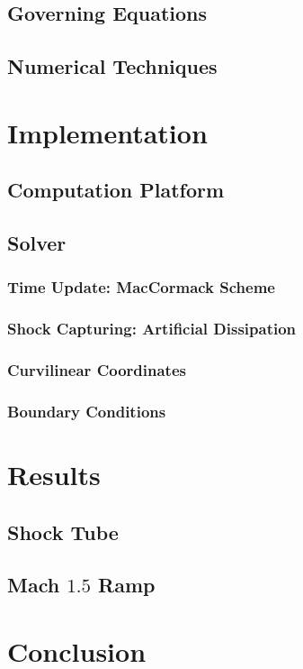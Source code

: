 \documentclass[paper=a4, fontsize=11pt]{scrartcl}
\numberwithin{equation}{section}        %
\numberwithin{figure}{section}          %
\numberwithin{table}{section}               %
\begin{document}
\subsection{Governing Equations}

\subsection{Numerical Techniques}

\section{Implementation}
\subsection{Computation Platform}

\subsection{Solver}
\subsubsection{Time Update: MacCormack Scheme}

\subsubsection{Shock Capturing: Artificial Dissipation}

\subsubsection{Curvilinear Coordinates}

\subsubsection{Boundary Conditions}


\section{Results}
\subsection{Shock Tube}

\subsection{Mach $1.5$ Ramp}

\section{Conclusion}
\end{document}
